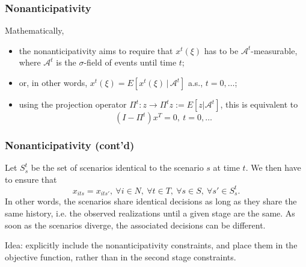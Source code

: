 \documentclass[french]{beamer}
\begin{document}
\begin{frame}
\frametitle{Nonanticipativity}

\begin{minipage}{0.45\textwidth}
\begin{center}
\hspace*{1cm} 
\end{center}
\end{minipage}
\hfill
\begin{minipage}{0.45\textwidth}
\begin{center}
\end{center}
\end{minipage}

Mathematically,
\begin{itemize}
\item
the nonanticipativity aims to require that $x^t(\xi)$ has to be $\mathcal{A}^t$-measurable, where $\mathcal{A}^t$ is the $\sigma$-field of events until time $t$;
\item
or, in other words, $x^t(\xi) = E[x^t(\xi) \,|\, \mathcal{A}^t]$ a.s., $t = 0,\ldots$;
\item
using the projection operator $\Pi^t: z \rightarrow \Pi^t z := E[ z | \mathcal{A}^t]$, this is equivalent to
\[
(I-\Pi^t)x^T = 0,\ t = 0,\ldots
\]
\end{itemize}

\end{frame}

\begin{frame}
\frametitle{Nonanticipativity (cont'd)}

Let $S_s^t$ be the set of scenarios identical to the  scenario $s$ at time $t$.
We then have to ensure that
\[
x_{its} = x_{its'},\ \forall i \in N,\ \forall t \in T,\ \forall s \in
S,\ \forall s' \in S_s^t.
\]
In other words, the scenarios share identical decisions as long as they share the same history, i.e. the observed realizations until a given stage are the same.
As soon as the scenarios diverge, the associated decisions can be different.

\mbox{}

{\red Idea}: explicitly include the nonanticipativity constraints, and place them in the objective function, rather than in the second stage constraints.

\end{frame}
\end{document}
